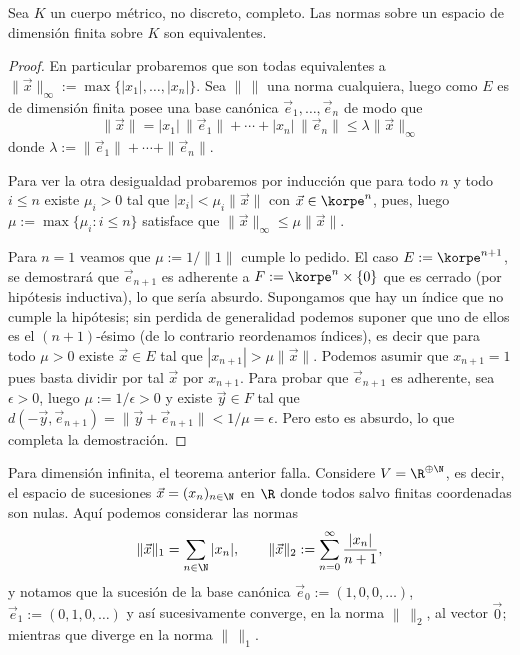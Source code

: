 \documentclass[topologia-analisis.tex]{subfiles}
\begin{document}
\begin{thm}
	Sea $K$ un cuerpo métrico, no discreto, completo.
	Las normas sobre un espacio de dimensión finita sobre $K$ son equivalentes.
\end{thm}
\begin{proof}
	En particular probaremos que son todas equivalentes a $\|\vec x\|_\infty := \max\{ |x_1|,\dots,|x_n| \} $.
	Sea $ \|\,\| $ una norma cualquiera, luego como $E$ es de dimensión finita posee una base canónica $\vec e_1,\dots,\vec e_n$ de modo que
	$$ \|\vec x\| = |x_1|\,\|\vec e_1\| + \cdots + |x_n|\,\|\vec e_n\| \le \lambda\|\vec x\|_\infty $$
	donde $\lambda := \|\vec e_1\| + \cdots + \|\vec e_n\|$.

	Para ver la otra desigualdad probaremos por inducción que para todo $n$ y todo $i\le n$ existe $\mu_i>0$
	tal que $|x_i| < \mu_i\|\vec x\|$ con $\vec x \in \korpe^n$, pues,
	luego $\mu := \max\{\mu_i: i\le n\}$ satisface que $\|\vec x\|_\infty \le \mu\|\vec x\|$.

	Para $n = 1$ veamos que $\mu := 1/\|1\|$ cumple lo pedido.
	El caso $E := \korpe^{n+1}$, se demostrará que $\vec e_{n+1}$ es adherente a $F := \korpe^n \times \{0\}$ que es cerrado (por hipótesis inductiva),
	lo que sería absurdo.
	Supongamos que hay un índice que no cumple la hipótesis; sin perdida de generalidad podemos suponer que uno de ellos
	es el $(n+1)$-ésimo (de lo contrario reordenamos índices), es decir que para todo $\mu > 0$ existe $\vec x\in E$ tal que $|x_{n+1}|>\mu\|\vec x\|$.
	Podemos asumir que $x_{n+1} = 1$ pues basta dividir por tal $\vec x$ por $x_{n+1}$.
	Para probar que $\vec e_{n+1}$ es adherente, sea $\epsilon > 0$, luego $\mu := 1/\epsilon > 0$
	y existe $\vec y\in F$ tal que $d(-\vec y, \vec e_{n+1}) = \|\vec y + \vec e_{n+1}\| < 1/\mu = \epsilon$.
	Pero esto es absurdo, lo que completa la demostración.
\end{proof}
\begin{ex}
	\warn
	Para dimensión infinita, el teorema anterior falla.
	Considere $V = \R^{\oplus\N}$, es decir, el espacio de sucesiones $\vec x = (x_n)_{n\in\N}$ en $\R$
	donde todos salvo finitas coordenadas son nulas.
	Aquí podemos considerar las normas
	\[
		\|\vec x\|_1 = \sum_{n\in\N} |x_n|, \qquad \|\vec x\|_2 := \sum_{n=0}^{\infty} \frac{|x_n|}{n+1},
	\]
	y notamos que la sucesión de la base canónica $\vec e_0 := (1, 0, 0, \dots)$, $\vec e_1 := (0, 1, 0, \dots)$ y así sucesivamente
	converge, en la norma $\|\,\|_2$, al vector $\Vec 0$; mientras que diverge en la norma $\|\,\|_1$.
\end{ex}
\end{document}
